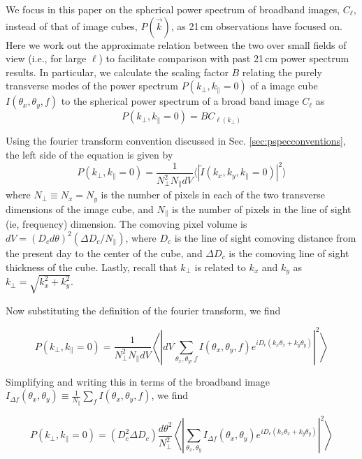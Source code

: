 \documentclass[numberedappendix]{emulateapj}
\begin{document}
We focus in this paper on the spherical power spectrum of broadband images, $C_\ell$,  instead of that of image cubes, $P(\vec{k})$, as 21\,cm observations have focused on. Here we work out the approximate relation between the two over small fields of view (i.e., for large $\ell$) to facilitate comparison with past 21\,cm power spectrum results. In particular, we calculate the scaling factor $B$ relating the purely transverse modes of the power spectrum $P(k_\perp,k_\parallel=0)$ of a image cube $I(\theta_x,\theta_y,f)$ to the spherical power spectrum of a broad band image $C_\ell$ as
\begin{equation}
P(k_\perp,k_\parallel=0) = B C_{\ell(k_\perp)}
\end{equation}

Using the fourier transform convention discussed in Sec. \ref{sec:pspecconventions}, the left side of the equation is given by
\begin{equation}
P(k_\perp,k_\parallel=0) = \frac{1}{N_\perp^2 N_\parallel dV}\langle|\tilde{I}(k_x,k_y,k_\parallel=0)|^2\rangle
\end{equation}
where $N_\perp\equiv N_x=N_y$ is the number of pixels in each of the two transverse dimensions of the image cube, and $N_\parallel$ is the number of pixels in the line of sight (ie, frequency) dimension. The comoving pixel volume is $dV = (D_c d\theta)^2 (\Delta D_c/N_\parallel)$, where $D_c$ is the line of sight comoving distance from the present day to the center of the cube, and $\Delta D_c$ is the comoving line of sight thickness of the cube. Lastly, recall that $k_\perp$ is related to $k_x$ and $k_y$ as $k_\perp=\sqrt{k_x^2+k_y^2}$.

Now substituting the definition of the fourier transform, we find

\begin{equation}
P(k_\perp,k_\parallel=0) =\frac{1}{N_\perp^2 N_\parallel dV}\left\langle\left|dV\sum_{\theta_x,\theta_y,f}I(\theta_x,\theta_y,f)e^{iD_c(k_x\theta_x+k_y\theta_y)}\right|^2\right\rangle
\end{equation}

Simplifying and writing this in terms of the broadband image $I_{\Delta f}(\theta_x,\theta_y)\equiv\frac{1}{N_\parallel}\sum_f  I(\theta_x,\theta_y,f)$, we find

\begin{equation}
P(k_\perp,k_\parallel=0) =(D_c^2 \Delta D_c)
\frac{d\theta^2}{N_\perp^2}\left\langle\left|\sum_{\theta_x,\theta_y}I_{\Delta f}(\theta_x,\theta_y)e^{iD_c(k_x\theta_x+k_y\theta_y)}\right|^2\right\rangle
\end{equation}
\end{document}
